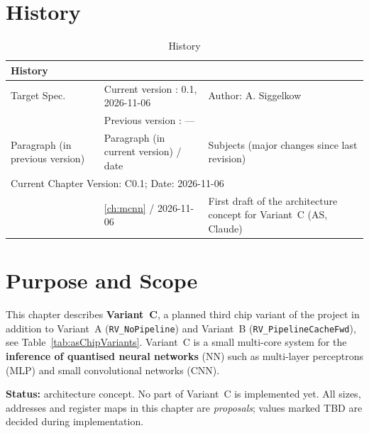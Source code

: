 \label{ch:mcnn}

\section{History}

\begin{table}[H]
\caption{History}
\label{tab:mcnnhistory01}
\centering
\begin{tabularx}{\textwidth}{|X |X |X |}
  \hline
  \multicolumn{3}{|l|}{History} \\
  \hline
  \multicolumn{1}{|l}{Target Spec.} & \multicolumn{1}{l}{Current version : 0.1, 2026-11-06} & \multicolumn{1}{l|}{Author: A. Siggelkow}\\
  \multicolumn{1}{|l}{ } & \multicolumn{1}{l}{Previous version : ---} & \multicolumn{1}{l|}{ }\\
  \hline
  \hline
  Paragraph (in previous version) & Paragraph (in current version) / date & Subjects (major changes since last revision) \\
  \hline
  \hline
  \multicolumn{3}{|l|}{Current Chapter Version: C0.1; Date: 2026-11-06} \\
  \hline
  & \ref{ch:mcnn} / 2026-11-06 & First draft of the architecture concept for Variant~C (AS, Claude) \\
  \hline
\end{tabularx}
\end{table}

\section{Purpose and Scope}
\label{sec:mcnnscope}

This chapter describes \textbf{Variant~C}, a planned third chip variant of
the \aschip project in addition to Variant~A (\texttt{RV\_NoPipeline}) and
Variant~B (\texttt{RV\_PipelineCacheFwd}), see
Table~\ref{tab:asChipVariants}.
Variant~C is a small multi-core system for the \textbf{inference of
quantised neural networks} (NN) such as multi-layer perceptrons (MLP) and
small convolutional networks (CNN).

\textbf{Status:} architecture concept. No part of Variant~C is implemented
yet. All sizes, addresses and register maps in this chapter are
\emph{proposals}; values marked TBD are decided during implementation.

